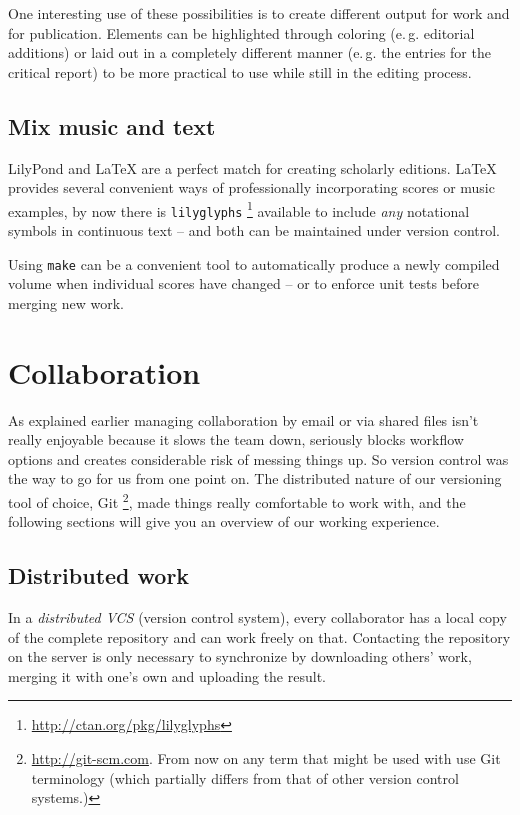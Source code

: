\documentclass[11pt,a4paper]{article}
\begin{document}
One interesting use of these possibilities is to create different output for work and for
publication. Elements can be highlighted through coloring (e.\,g. editorial additions)
or laid out in a completely different manner (e.\,g. the entries for the critical report) to 
be more practical to use while still in the editing process.

\subsection{Mix music and text}
LilyPond and \LaTeX{} are a perfect match for creating scholarly editions. \LaTeX{}
provides several convenient ways of professionally incorporating scores or music examples,
by now there is \texttt{lilyglyphs}%
\footnote{\url{http://ctan.org/pkg/lilyglyphs}}
available to include \emph{any} notational symbols in continuous text -- and both
can be maintained under version control.

Using \texttt{make} can be a convenient tool to automatically produce a newly compiled
volume when individual scores have changed -- or to enforce unit tests before merging
new work.

\section{Collaboration}\label{sec:collaboration}
As explained earlier managing collaboration by email or via shared files isn't really
enjoyable because it slows the team down, seriously blocks workflow options and creates considerable risk
of messing things up. So version control was the way to go for us from one point on.
The distributed nature of our versioning tool of choice, Git%
\footnote{\url{http://git-scm.com}. From now on any term that might be used with use
Git terminology (which partially differs from that of other version control systems.)},
made things really comfortable to work with, and the following sections will give you
an overview of our working experience.

\subsection{Distributed work}
In a \textsl{distributed VCS} (version control system), every collaborator
has a local copy of the complete repository and can work freely on that.
Contacting the repository on the server is only necessary to synchronize by downloading
others' work, merging it with one's own and uploading the result.
\end{document}
